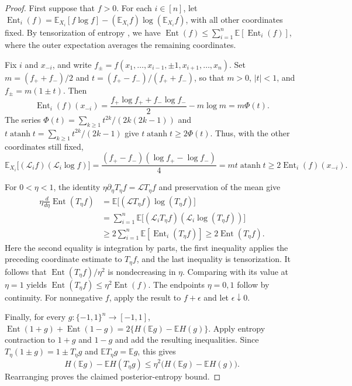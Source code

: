 \documentclass[11pt,letterpaper]{amsart}
\newcommand{\E}{\mathbb E}
\newcommand{\1}{\mathbf 1}
\DeclareMathOperator{\Ent}{Ent}
\DeclareMathOperator{\atanh}{atanh}
\numberwithin{equation}{section}
\begin{document}
\begin{proof}
First suppose that $f>0$. For each $i\in[n]$, let
$\Ent_i(f)=\E_{X_i}[f\log f]
-(\E_{X_i}f)\log(\E_{X_i}f)$, with all other coordinates fixed.
By tensorization of entropy
\cite[Theorem~4.22]{BoucheronLugosiMassart2013},
we have $\Ent(f)\le\sum_{i=1}^n\E[\Ent_i(f)]$,
where the outer expectation averages the remaining coordinates.

Fix $i$ and $x_{-i}$, and write
$f_\pm=f(x_1,\ldots,x_{i-1},\pm1,x_{i+1},\ldots,x_n)$.
Set $m=(f_++f_-)/2$ and $t=(f_+-f_-)/(f_++f_-)$,
so that $m>0$, $|t|<1$, and $f_\pm=m(1\pm t)$.
Then
\[
 \Ent_i(f)(x_{-i})
 =\frac{f_+\log f_++f_-\log f_-}{2}-m\log m
 =m\Phi(t).
\]
The series
$\Phi(t)=\sum_{k\ge1}t^{2k}/(2k(2k-1))$ and
$t\atanh t=\sum_{k\ge1}t^{2k}/(2k-1)$ give
$t\atanh t\ge2\Phi(t)$. Thus, with the other coordinates
still fixed,
\[
 \E_{X_i}\bigl[(\mathcal L_i f)
                  (\mathcal L_i\log f)\bigr]
 =\frac{(f_+-f_-)(\log f_+-\log f_-)}{4}
 =mt\atanh t
 \ge2\Ent_i(f)(x_{-i}).
\]

For $0<\eta<1$, the identity
$\eta\partial_\eta T_\eta f=\mathcal L T_\eta f$
and preservation of the mean give
\[
 \begin{aligned}
 \eta\frac{d}{d\eta}\Ent(T_\eta f)
 &=\E\bigl[(\mathcal L T_\eta f)\log(T_\eta f)\bigr]\\
 &=\sum_{i=1}^n
   \E\bigl[(\mathcal L_iT_\eta f)
           (\mathcal L_i\log(T_\eta f))\bigr]\\
 &\ge2\sum_{i=1}^n\E[\Ent_i(T_\eta f)]
 \ge2\Ent(T_\eta f).
 \end{aligned}
\]
Here the second equality is integration by parts, the first
inequality applies the preceding coordinate estimate to
$T_\eta f$, and the last inequality is tensorization.
It follows that $\Ent(T_\eta f)/\eta^2$ is nondecreasing
in $\eta$. Comparing with its value at $\eta=1$ yields
$\Ent(T_\eta f)\le\eta^2\Ent(f)$.
The endpoints $\eta=0,1$ follow by continuity.
For nonnegative $f$, apply the result to $f+\epsilon$
and let $\epsilon\downarrow0$.

Finally, for every $g:\{-1,1\}^n\to[-1,1]$,
$\Ent(1+g)+\Ent(1-g)=2\{H(\E g)-\E H(g)\}$.
Apply entropy contraction to $1+g$ and $1-g$ and add
the resulting inequalities. Since
$T_\eta(1\pm g)=1\pm T_\eta g$ and
$\E T_\eta g=\E g$, this gives
\[
 H(\E g)-\E H(T_\eta g)
 \le\eta^2\bigl(H(\E g)-\E H(g)\bigr).
\]
Rearranging proves the claimed posterior-entropy bound.
\end{proof}
\end{document}
